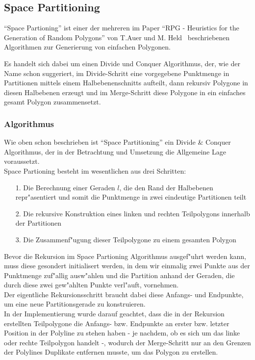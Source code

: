 
\subsection{Space Partitioning}

``Space Partioning'' ist einer der mehreren im Paper ``RPG - Heuristics for the
Generation of Random Polygons'' von T.Auer und M. Held~\cite{held98polygons}
beschriebenen Algorithmen zur Generierung von einfachen Polygonen.

Es handelt sich dabei um einen Divide und Conquer Algorithmus, der, wie der
Name schon suggeriert, im Divide-Schritt eine vorgegebene Punktmenge in
Partitionen mittels einem Halbebenenschnitts aufteilt, dann rekursiv Polygone
in diesen Halbebenen erzeugt und im Merge-Schritt diese Polygone in ein einfaches
gesamt Polygon zusammensetzt.

\subsubsection{Algorithmus}

Wie oben schon beschrieben ist ``Space Partitioning'' ein Divide \& Conquer Algorithmus,
der in der Betrachtung und Umsetzung die Allgemeine Lage voraussetzt. \\

\noindent
Space Partioning besteht im wesentlichen aus drei Schritten:
\begin{itemize}
  \item[1.] Die Berechnung einer Geraden $l$, die den Rand der Halbebenen repr"asentiert
            und somit die Punktmenge in zwei eindeutige Partitionen teilt
  \item[2.] Die rekursive Konstruktion eines linken und rechten Teilpolygons innerhalb
            der Partitionen
  \item[3.] Die Zusammenf"ugung dieser Teilpolygone zu einem gesamten Polygon
\end{itemize}

\noindent
Bevor die Rekursion im Space Partioning Algorithmus ausgef"uhrt werden
kann, muss diese gesondert initialisert werden, in dem wir einmalig zwei Punkte aus der
Punktmenge zuf"allig ausw"ahlen und die Partition anhand der Geraden, die durch diese
zwei gew"ahlten Punkte verl"auft, vornehmen. \\
Der eigentliche Rekursionsschritt braucht dabei diese Anfangs- und Endpunkte, um eine
neue Partitionsgerade zu konstruieren. \\
In der Implementierung wurde darauf geachtet, dass die in der Rekursion erstellten
Teilpolygone die Anfangs- bzw. Endpunkte an erster bzw. letzter Position in der
Polyline zu stehen haben - je nachdem, ob es sich um das linke oder rechte Teilpolygon
handelt -, wodurch der Merge-Schritt nur an den Grenzen der Polylines Duplikate entfernen
musste, um das Polygon zu erstellen.

